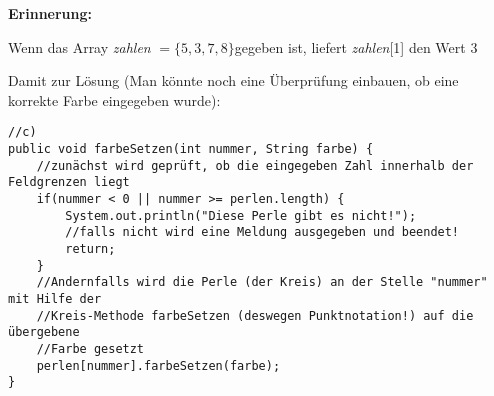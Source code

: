 \documentclass{article}
\begin{document}
\textbf{Erinnerung:}
\begin{center}
    Wenn das Array \textit{zahlen} $= \{5,3,7,8\}$gegeben ist, liefert \textit{zahlen}[1] den Wert $3$ 
\end{center}
Damit zur Lösung (Man könnte noch eine Überprüfung einbauen, ob eine korrekte Farbe eingegeben wurde):
\begin{verbatim}
//c)
public void farbeSetzen(int nummer, String farbe) {
    //zunächst wird geprüft, ob die eingegeben Zahl innerhalb der Feldgrenzen liegt
    if(nummer < 0 || nummer >= perlen.length) {
        System.out.println("Diese Perle gibt es nicht!");
        //falls nicht wird eine Meldung ausgegeben und beendet!
        return;
    }
    //Andernfalls wird die Perle (der Kreis) an der Stelle "nummer" mit Hilfe der
    //Kreis-Methode farbeSetzen (deswegen Punktnotation!) auf die übergebene
    //Farbe gesetzt
    perlen[nummer].farbeSetzen(farbe);
}
\end{verbatim}
\end{document}
